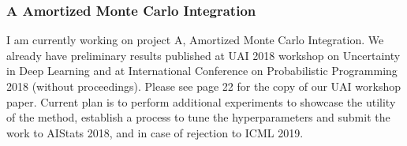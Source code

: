 \documentclass[12pt]{article}
\begin{document}
\subsubsection*{A \quad Amortized Monte Carlo Integration}
I am currently working on project A, Amortized Monte Carlo Integration.
We already have preliminary results published at UAI 2018 workshop on Uncertainty in Deep Learning \citep{golinski2018uai} and at International Conference on Probabilistic Programming 2018 \citep{golinski2018probprog} (without proceedings).
Please see page 22 for the copy of our UAI workshop paper.
Current plan is to perform additional experiments to showcase the utility of the method, establish a process to tune the hyperparameters and submit the work to AIStats 2018, and in case of rejection to ICML 2019.
 
\end{document}
